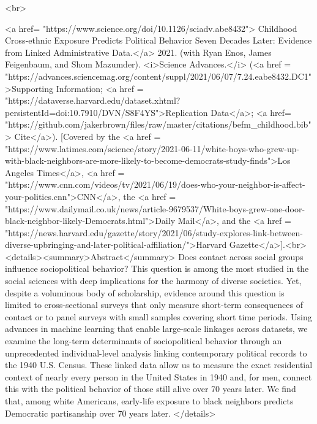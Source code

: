     <br>


    <a href= "https://www.science.org/doi/10.1126/sciadv.abe8432"> Childhood Cross-ethnic Exposure Predicts Political Behavior Seven Decades Later: Evidence from Linked Administrative Data.</a> 2021. (with Ryan Enos, James Feigenbaum, and Shom Mazumder). <i>Science Advances.</i>  (<a href = "https://advances.sciencemag.org/content/suppl/2021/06/07/7.24.eabe8432.DC1">Supporting Information; <a href = "https://dataverse.harvard.edu/dataset.xhtml?persistentId=doi:10.7910/DVN/S8F4YS">Replication Data</a>; <a href= "https://github.com/jakerbrown/files/raw/master/citations/befm_childhood.bib"> Cite</a>). [Covered by the <a href = "https://www.latimes.com/science/story/2021-06-11/white-boys-who-grew-up-with-black-neighbors-are-more-likely-to-become-democrats-study-finds">Los Angeles Times</a>, <a href = "https://www.cnn.com/videos/tv/2021/06/19/does-who-your-neighbor-is-affect-your-politics.cnn">CNN</a>, the <a href = "https://www.dailymail.co.uk/news/article-9679537/White-boys-grew-one-door-black-neighbor-likely-Democrats.html">Daily Mail</a>, and the <a href = "https://news.harvard.edu/gazette/story/2021/06/study-explores-link-between-diverse-upbringing-and-later-political-affiliation/">Harvard Gazette</a>].<br><details><summary>Abstract</summary>
          Does contact across social groups influence sociopolitical behavior? This question is among the most studied in the social sciences with deep implications for the harmony of diverse societies. Yet, despite a voluminous body of scholarship, evidence around this question is limited to cross-sectional surveys that only measure short-term consequences of contact or to panel surveys with small samples covering short time periods. Using advances in machine learning that enable large-scale linkages across datasets, we examine the long-term determinants of sociopolitical behavior through an unprecedented individual-level analysis linking contemporary political records to the 1940 U.S. Census. These linked data allow us to measure the exact residential context of nearly every person in the United States in 1940 and, for men, connect this with the political behavior of those still alive over 70 years later. We find that, among white Americans, early-life exposure to black neighbors predicts Democratic partisanship over 70 years later.
          </details>
